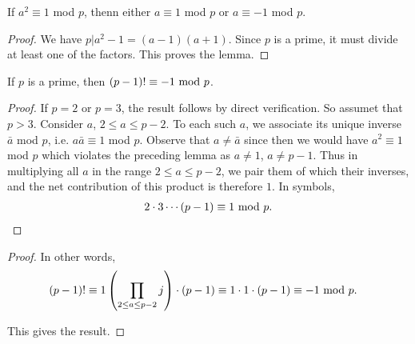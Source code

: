 
\begin{mysubsection}{}
    \begin{theorem}[pps:]{}
        If $a^2\equiv 1$ mod $p$, thenn either $a\equiv 1$ mod $p$ or $a\equiv -1$ mod $p$.
    \end{theorem}

    \begin{proof}
        We have $p|a^2-1=(a-1)(a+1)$. Since $p$ is a prime, it must divide at least one of the factors. This proves the lemma.
    \end{proof}

    \begin{theorem}[thm:]{}
        If $p$ is a prime, then $(p-1)!\equiv -1 \textnormal{ mod }p$.
    \end{theorem}

    \begin{proof}
        If $p=2$ or $p=3$, the result follows by direct verification. So assumet that $p>3$. Consider $a$, $2\leq a\leq p-2$. To each such $a$, we associate its unique inverse $\bar{a}$ mod $p$, i.e. $a\bar{a}\equiv 1$ mod $p$. Observe that $a\neq \bar{a}$ since then we would have $a^2\equiv 1$ mod $p$ which violates the preceding lemma as $a\neq 1$, $a\neq p-1$. Thus in multiplying all $a$ in the range $2\leq a\leq p-2$, we pair them of which their inverses, and the net contribution of this product is therefore $1$. In symbols,
        \begin{alignat*}{1}
            2\cdot 3\cdots(p-1)\equiv 1 \textnormal{ mod }p.
        \end{alignat*}
    \end{proof}
    \begin{proof}
        In other words,
        \begin{alignat*}{1}
            (p-1)!\equiv 1\left(\prod_{2\leq a\leq p-2}j\right)\cdot (p-1)&\equiv 1\cdot 1\cdot (p-1)\equiv -1\textnormal{ mod }p.
        \end{alignat*}

        This gives the result.
    \end{proof}
\end{mysubsection}

